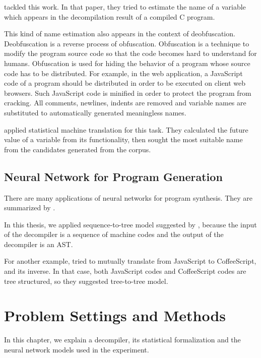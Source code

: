 \documentclass[senior,final,11pt]{iscs-thesis}
\begin{document}
\citet{name_recover_from_decompile_result} tackled this work. 
In that paper, they tried to estimate the name of a variable which appears in the decompilation result of a compiled C program.

This kind of name estimation also appears in the context of deobfuscation.
\citep{deobfsucation_matome}
Deobfuscation is a reverse process of obfuscation.
Obfuscation is a technique to modify the program source code so that the code becomes hard to understand for humans. 
Obfuscation is used for hiding the behavior of a program whose source code has to be distributed.
For example, in the web application, a JavaScript code of a program should be distributed in order to be executed on client web browsers.
Such JavaScript code is minified in order to protect the program from cracking. 
All comments, newlines, indents are removed and variable names are substituted to automatically generated meaningless names. 

\citet{JSNaughty} applied statistical machine translation for this task. 
They calculated the future value of a variable from its functionality, then 
sought the most suitable name from the candidates generated from the corpus.


\section{Neural Network for Program Generation}

There are many applications of neural networks for program synthesis. They are summarized by \citet{deep_programming_matome}.

In this thesis, we applied sequence-to-tree model suggested by \citet{Seq2Tree}, 
because the input of the decompiler is a sequence of machine codes and
the output of the decompiler is an AST.

For another example, \citet{coffeescript_to_javascript} tried to mutually translate from JavaScript to CoffeeScript, and its inverse.
In that case, both JavaScript codes and CoffeeScript codes are tree structured, so they suggested tree-to-tree model.


\chapter{Problem Settings and Methods}

In this chapter, we explain a decompiler, its statistical formalization and 
the neural network models used in the experiment.
\end{document}
